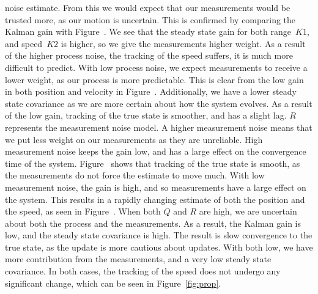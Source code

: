 \documentclass[a4paper,12pt]{article}
\begin{document}
\begin{enumerate}
  noise estimate. From this we would expect that our measurements would be
  trusted more, as our motion is uncertain. This is confirmed by comparing the
  Kalman gain with Figure~. We see that the steady state gain
  for both range~$K1$, and speed~$K2$ is higher, so we give the measurements
  higher weight. As a result of the higher process noise, the tracking of the
  speed suffers, it is much more difficult to predict. With low process noise,
  we expect measurements to receive a lower weight, as our process is more
  predictable. This is clear from the low gain in both position and velocity in
  Figure~. Additionally, we have a lower steady state
  covariance as we are more certain about how the system evolves. As a result of
  the low gain, tracking of the true state is smoother, and has a slight
  lag. $R$ represents the measurement noise model. A higher measurement noise
  means that we put less weight on our measurements as they are unreliable. High
  measurement noise keeps the gain low, and has a large effect on the
  convergence time of the system. Figure~ shows that tracking
  of the true state is smooth, as the measurements do not force the estimate to
  move much. With low measurement noise, the gain is high, and so measurements
  have a large effect on the system. This results in a rapidly changing estimate
  of both the position and the speed, as seen in Figure~. When
  both $Q$ and $R$ are high, we are uncertain about both the process and the
  measurements. As a result, the Kalman gain is low, and the steady state
  covariance is high. The result is slow convergence to the true state, as the
  update is more cautious about updates. With both low, we have more
  contribution from the measurements, and a very low steady state covariance. In
  both cases, the tracking of the speed does not undergo any significant change,
  which can be seen in Figure~\ref{fig:prop}.


\end{enumerate}
\end{document}
